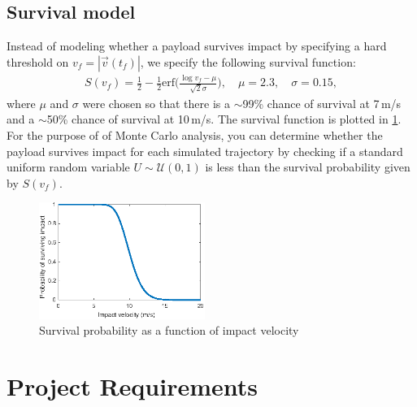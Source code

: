 \documentclass[11pt]{article}
\begin{document}
\subsection{Survival model}
Instead of modeling whether a payload survives impact by specifying a hard threshold on $v_f=|\vec{v}(t_f)|$, we specify the following survival function:
\begin{align*}
  S(v_f) = \frac{1}{2}-\frac{1}{2}\text{erf}\biggl(\frac{\log v_f-\mu}{\sqrt{2}\sigma}\biggr),\quad \mu=2.3,\quad \sigma=0.15,
\end{align*}
where $\mu$ and $\sigma$ were chosen so that there is a $\sim$99\% chance of survival at 7\,m/s and a $\sim$50\% chance of survival at 10\,m/s. The survival function is plotted in \cref{fig:survival}.
For the purpose of of Monte Carlo analysis, you can determine whether the payload survives impact for each simulated trajectory by checking if a standard uniform random variable $U\sim\mathcal{U}(0,1)$ is less than the survival probability given by $S(v_f)$.
\begin{figure}[H]
\includegraphics[width=0.48\textwidth]{figures/survival.eps}
\caption{Survival probability as a function of impact velocity}
\label{fig:survival}
\end{figure}

\section{Project Requirements}
\end{document}
